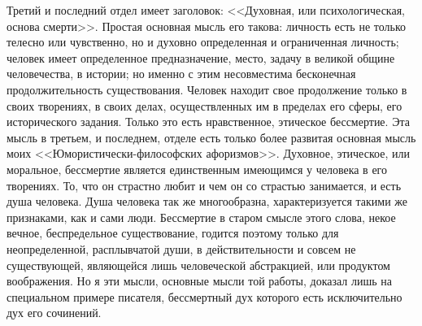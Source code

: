 \documentclass[12pt]{article}
\begin{document}
Третий и последний отдел имеет заголовок: <<Духовная, или психологическая, основа смерти>>. Простая основная мысль его такова: личность есть не только телесно или чувственно, но и духовно определенная и ограниченная личность; человек имеет определенное предназначение, место, задачу в великой общине человечества, в истории; но именно с этим несовместима бесконечная продолжительность существования. Человек находит свое продолжение только в своих творениях, в своих делах, осуществленных им в пределах его сферы, его исторического задания. Только это есть нравственное, этическое бессмертие. Эта мысль в третьем, и последнем, отделе есть только более развитая основная мысль моих <<Юмористически-философских афоризмов>>. Духовное, этическое, или моральное, бессмертие является единственным имеющимся у человека в его творениях. То, что он страстно любит и чем он со страстью занимается, и есть душа человека. Душа человека так же многообразна, характеризуется такими же признаками, как и сами люди. Бессмертие в старом смысле этого слова, некое вечное, беспредельное существование, годится поэтому только для неопределенной, расплывчатой души, в действительности и совсем не существующей, являющейся лишь человеческой абстракцией, или продуктом воображения. Но я эти мысли, основные мысли той работы, доказал лишь на специальном примере писателя, бессмертный дух которого есть исключительно дух его сочинений. 
\end{document}
